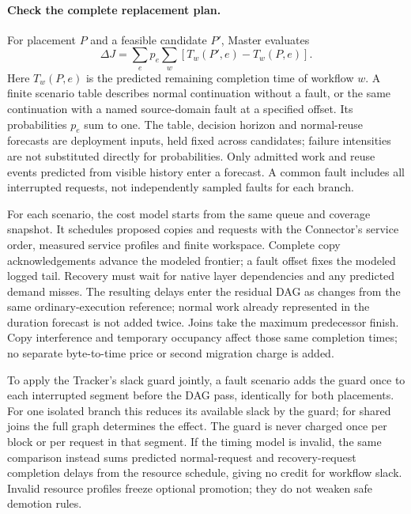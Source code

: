\paragraph{Check the complete replacement plan.}

For placement $P$ and a feasible candidate $P'$, Master evaluates
\begin{equation}
 \Delta J=\sum_e p_e\sum_w
       [T_w(P',e)-T_w(P,e)].
 \label{eq:value}
\end{equation}
Here $T_w(P,e)$ is the predicted remaining completion time of workflow
$w$. A finite scenario table describes normal continuation without a
fault, or the same continuation with a named source-domain fault at a
specified offset. Its probabilities $p_e$ sum to one. The table, decision
horizon and normal-reuse forecasts are deployment inputs, held fixed
across candidates; failure intensities are not substituted directly for
probabilities. Only admitted work and reuse events predicted from visible
history enter a forecast. A common fault includes all interrupted
requests, not independently sampled faults for each branch.

For each scenario, the cost model starts from the same queue and coverage
snapshot. It schedules proposed copies and requests with the Connector's
service order, measured service profiles and finite workspace. Complete
copy acknowledgements advance the modeled frontier; a fault offset fixes
the modeled logged tail. Recovery must wait for native layer dependencies
and any predicted demand misses. The resulting delays enter the residual
DAG as changes from the same ordinary-execution reference; normal work
already represented in the duration forecast is not added twice. Joins
take the maximum predecessor finish. Copy interference
and temporary occupancy affect those same completion times; no separate
byte-to-time price or second migration charge is added.

To apply the Tracker's slack guard jointly, a fault scenario adds the
guard once to each interrupted segment before the DAG pass, identically
for both placements. For one isolated branch this reduces its available
slack by the guard; for shared joins the full graph determines the effect.
The guard is never charged once per block or per request in that segment.
If the timing model is invalid, the same comparison instead sums predicted
normal-request and recovery-request completion delays from the resource
schedule, giving no credit for workflow slack. Invalid resource profiles
freeze optional promotion; they do not weaken safe demotion rules.

